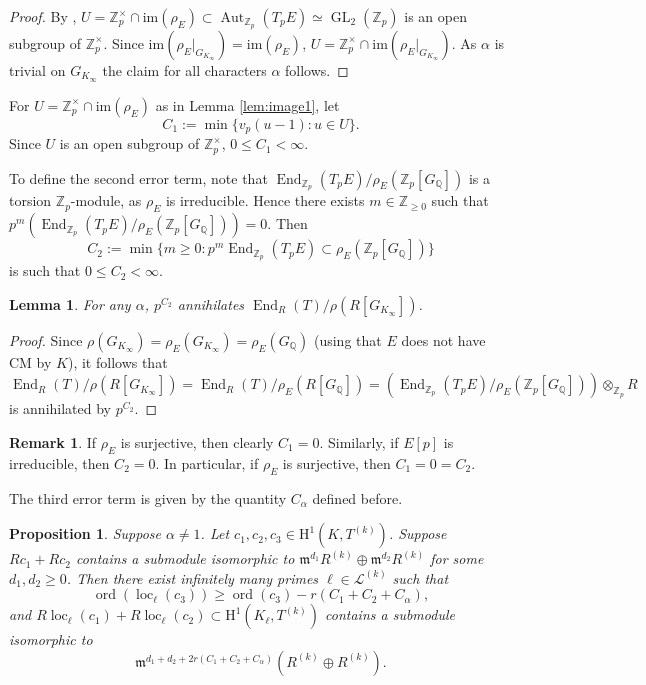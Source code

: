 \documentclass[10pt]{amsart}
\numberwithin{equation}{section}
\newtheorem{lemma}[theorem]{Lemma}
\newtheorem{prop}[theorem]{Proposition}
\theoremstyle{definition}
\newtheorem{remark}[theorem]{Remark}
\theoremstyle{remark}
\newcommand{\Z}{\mathbb{Z}}
\newcommand{\Q}{\mathbb{Q}}
\newcommand{\rH}{\mathrm{H}}
\newcommand{\fm}{\mathfrak{m}}
\DeclareMathOperator{\loc}{loc}
\DeclareMathOperator{\ord}{ord}
\DeclareMathOperator{\GL}{GL}
\DeclareMathOperator{\Aut}{Aut}
\DeclareMathOperator{\End}{End}
\newcommand{\CL}{\mathscr{L}}
\begin{document}
\begin{proof}  
By %
\cite[Prop.~(6.1.1)(i)]{nekovar}, $U=\Z_p^\times\cap \mathrm{im}(\rho_E)\subset \Aut_{\Z_p}(T_pE)\simeq \GL_2(\Z_p)$ 
is an open subgroup of $\Z_p^\times$. Since 
$\mathrm{im}(\rho_E|_{G_{K_\infty}}) =  \mathrm{im}(\rho_E)$, 
$U = \Z_p^\times\cap \mathrm{im}(\rho_E|_{G_{K_\infty}})$. 
As $\alpha$ is trivial on $G_{K_\infty}$ the claim for all characters $\alpha$ follows.
\end{proof}

For $U = \Z_p^\times\cap \mathrm{im}(\rho_E)$ as in Lemma \ref{lem:image1}, let
\[
C_1 := \min\{v_p(u-1)\colon u\in U\}.
\]
Since $U$ is an open subgroup of $\Z_p^\times$, $0\leqslant C_1 < \infty$.

To define the second error term, note that $\End_{\Z_p}(T_pE)/\rho_E(\Z_p[G_{\Q}])$ is a torsion $\Z_p$-module, as $\rho_E$ is irreducible. Hence there exists $m\in\Z_{\geq 0}$ such that $p^m (\End_{\Z_p}(T_pE)/\rho_E(\Z_p[G_{\Q}]))=0$. Then
\[
C_2:=\min\bigl\{ m\geqslant 0 \colon p^m\End_{\Z_p}(T_pE)\subset\rho_E(\Z_p[G_{\Q}])\bigr\}
\]
is such that $0\leqslant C_2 <\infty$. 

\begin{lemma}\label{lem:image2} For any $\alpha$,  $p^{C_2}$ annihilates
$\End_R(T)/\rho(R[G_{K_\infty}])$. 
\end{lemma}

\begin{proof}  
Since $\rho(G_{K_\infty}) = \rho_E(G_{K_\infty}) = \rho_E(G_\Q)$ (using that $E$ does not have CM by $K$), it follows that
$$
\End_R(T)/\rho(R[G_{K_\infty}]) = \End_R(T)/\rho_E(R[G_\Q]) = (\End_{\Z_p}(T_pE)/\rho_E(\Z_p[G_\Q]))\otimes_{\Z_p}R
$$
is annihilated by $p^{C_2}$.
\end{proof}

\begin{remark}\label{rmkirred} 
If $\rho_E$ is surjective, then clearly $C_1 = 0$. Similarly, if $E[p]$ is irreducible, then $C_2=0$. In particular, if $\rho_E$ is surjective, then $C_1 = 0 = C_2$.
\end{remark}

The third error term is given by the quantity $C_\alpha$ defined before.


\begin{prop}\label{prop:prime2} Suppose $\alpha\neq 1$.
Let $c_1, c_2, c_3 \in \rH^1(K,T^{(k)})$. Suppose $Rc_1 + Rc_2$ contains a submodule isomorphic to 
$\fm^{d_1}R^{(k)}\oplus \fm^{d_2}R^{(k)}$ for some $d_1,d_2\geqslant 0$.
Then there exist infinitely many primes $\ell\in \CL^{(k)}$ such that 
$$
\ord(\loc_\ell(c_3)) \geqslant \ord(c_3) - r(C_1+C_2+C_\alpha),  
$$
and
$R\loc_\ell(c_1) + R \loc_\ell(c_2) \subset \rH^1(K_\ell,T^{(k)})$ contains a
submodule isomorphic to 
$$
\fm^{d_1+d_2+2r(C_1+C_2+C_\alpha)}(R^{(k)}\oplus R^{(k)}).
$$
\end{prop}
\end{document}
